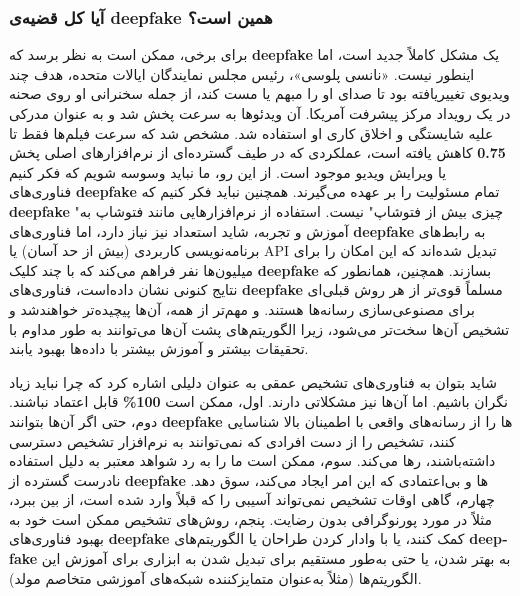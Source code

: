 {
\subsubsection*{آیا کل قضیه‌ی \textenglish{\textbf{deepfake}} همین است؟}
\label{subsubsec:آیا کل قضیه‌ی deepfake همین است؟}
برای برخی، ممکن است به نظر برسد که \textenglish{\textbf{deepfake}} یک مشکل کاملاً جدید است، اما اینطور نیست. «نانسی پلوسی»، رئیس مجلس نمایندگان ایالات متحده، هدف چند ویدیوی تغییر‌یافته بود تا صدای او را مبهم یا مست کند، از جمله سخنرانی او روی صحنه در یک رویداد مرکز پیشرفت آمریکا. آن ویدئوها به سرعت پخش شد و به عنوان مدرکی علیه شایستگی و اخلاق کاری او استفاده شد. مشخص شد که سرعت فیلم‌ها فقط تا \textenglish{\textbf{0.75}} کاهش یافته است، عملکردی که در طیف گسترده‌ای از نرم‌افزارهای اصلی پخش یا ویرایش ویدیو موجود است. از این رو، ما نباید وسوسه شویم که فکر کنیم فناوری‌های \textenglish{\textbf{deepfake}} تمام مسئولیت را بر عهده می‌گیرند. همچنین نباید فکر کنیم که \textenglish{\textbf{deepfake}} "چیزی بیش از فتوشاپ" نیست. استفاده از نرم‌افزارهایی مانند فتوشاپ به آموزش و تجربه، شاید استعداد نیز نیاز دارد، اما فناوری‌های \textenglish{\textbf{deepfake}} به رابط‌های برنامه‌نویسی کاربردی (بیش از حد آسان) یا API تبدیل شده‌اند که این امکان را برای میلیون‌ها نفر فراهم می‌کند که با چند کلیک \textenglish{\textbf{deepfake}} بسازند. همچنین، همانطور که نتایج کنونی نشان داده‌است، فناوری‌های \textenglish{\textbf{deepfake}} مسلماً قوی‌تر از هر روش قبلی‌ای برای مصنوعی‌سازی رسانه‌ها هستند. و مهم‌تر از همه، آن‌ها پیچیده‌تر خواهند‌شد و تشخیص آن‌ها سخت‌تر می‌شود، زیرا الگوریتم‌های پشت آن‌ها می‌توانند به طور مداوم با تحقیقات بیشتر و آموزش بیشتر با داده‌ها بهبود یابند.
}

شاید بتوان به فناوری‌های تشخیص عمقی به عنوان دلیلی اشاره کرد که چرا نباید زیاد نگران باشیم.
اما آن‌ها نیز مشکلاتی دارند.
اول، ممکن است \textenglish{\textbf{100\%}} قابل اعتماد نباشند.
دوم، حتی اگر آن‌ها بتوانند \textenglish{\textbf{deepfake}} ها را از رسانه‌های واقعی با اطمینان بالا شناسایی کنند، تشخیص را از دست افرادی که نمی‌توانند به نرم‌افزار تشخیص دسترسی داشته‌باشند، رها می‌کند.
سوم، ممکن است ما را به رد شواهد معتبر به دلیل استفاده نادرست گسترده از \textenglish{\textbf{deepfake}} ‌ها و بی‌اعتمادی که این امر ایجاد می‌کند، سوق دهد.
چهارم، گاهی اوقات تشخیص نمی‌تواند آسیبی را که قبلاً وارد شده است، از بین ببرد، مثلاً در مورد پورنوگرافی بدون رضایت.
پنجم، روش‌های تشخیص ممکن است خود به بهبود فناوری‌های \textenglish{\textbf{deepfake}} کمک کنند، یا با وادار کردن طراحان یا الگوریتم‌های \textenglish{\textbf{deepfake}} به بهتر شدن، یا حتی به‌طور مستقیم برای تبدیل شدن به ابزاری برای آموزش این الگوریتم‌ها (مثلاً به‌عنوان متمایزکننده شبکه‌های آموزشی متخاصم مولد).

